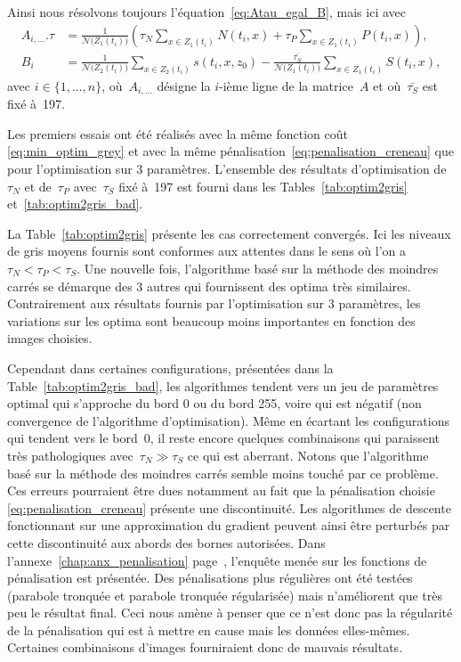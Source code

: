 \documentclass[main.tex]{subfiles}
\begin{document}
Ainsi nous résolvons toujours l'équation~\eqref{eq:Atau_egal_B}, mais ici avec
\begin{equation}
\label{eq:corresp_A_integ}
\begin{aligned}
A_{i,...}.\tau & = \frac{1}{\mathcal{N}\big(Z_1(t_i)\big)}\left( \tau_N\!\!\sum_{x\in Z_1(t_i)}\!\!N(t_i,x) + \tau_P\!\!\sum_{x\in Z_1(t_i)}\!\!P(t_i,x) \right), \\
B_i &= \frac{1}{\mathcal{N}\big(Z_2(t_i)\big)} \sum_{x\in Z_2(t_i)}\!\! s(t_i,x,z_0) - \frac{\bar{\tau_S}}{\mathcal{N}\big(Z_1(t_i)\big)}\sum_{x\in Z_1(t_i)}\!\!S(t_i,x),
\end{aligned}
\end{equation}
avec $i \in \{1,...,n\}$, 
où~$A_{i,...}$ désigne la $i$-ième ligne de la matrice~$A$ et où~$\bar{\tau_S}$ est fixé à~197.


Les premiers essais ont été réalisés avec la même fonction coût \eqref{eq:min_optim_grey} et avec la même pénalisation~\eqref{eq:penalisation_creneau} que pour l'optimisation sur 3 paramètres. 
L'ensemble des résultats d'optimisation de~$\tau_N$ et de~$\tau_P$ avec~$\tau_S$ fixé à~197  %
est fourni dans les Tables~\ref{tab:optim2gris} et~\ref{tab:optim2gris_bad}. 


La Table~\ref{tab:optim2gris} présente les cas correctement convergés. Ici les niveaux de gris moyens fournis sont conformes aux attentes dans le sens où l'on a~$\tau_N{<}\tau_P{<}\tau_S$.  Une nouvelle fois, l'algorithme basé sur la méthode des moindres carrés se démarque des 3 autres qui fournissent des optima très similaires. 
Contrairement aux résultats fournis par l'optimisation sur 3 paramètres, les variations sur les optima sont beaucoup moins importantes en fonction des images choisies.


Cependant dans certaines configurations, présentées dans la Table~\ref{tab:optim2gris_bad}, les algorithmes tendent vers un jeu de paramètres optimal qui s'approche du bord 0 ou du bord 255, voire qui est négatif (\ie non convergence de l'algorithme d'optimisation). 
Même en écartant les configurations qui tendent vers le bord~0, il reste encore quelques combinaisons qui paraissent très pathologiques avec~$\tau_N{\gg}\tau_S$ ce qui est aberrant. 
Notons que l'algorithme basé sur la méthode des moindres carrés semble moins touché par ce problème. 
Ces erreurs pourraient être dues notamment au fait que la pénalisation choisie \eqref{eq:penalisation_creneau} présente une discontinuité. 
Les algorithmes de descente fonctionnant sur une approximation du gradient peuvent ainsi être perturbés par cette discontinuité  aux abords des bornes autorisées. Dans l'annexe~\ref{chap:anx_penalisation} page~\pageref{chap:anx_penalisation}, l'enquête menée sur les fonctions de pénalisation est présentée. 
Des pénalisations plus régulières ont été testées (parabole tronquée et parabole tronquée régularisée) mais n'améliorent que très peu le résultat final. Ceci nous amène à penser que ce n'est donc pas la régularité de la pénalisation qui est à mettre en cause mais les données elles-mêmes. Certaines combinaisons d'images fourniraient donc de mauvais résultats. 
\end{document}
